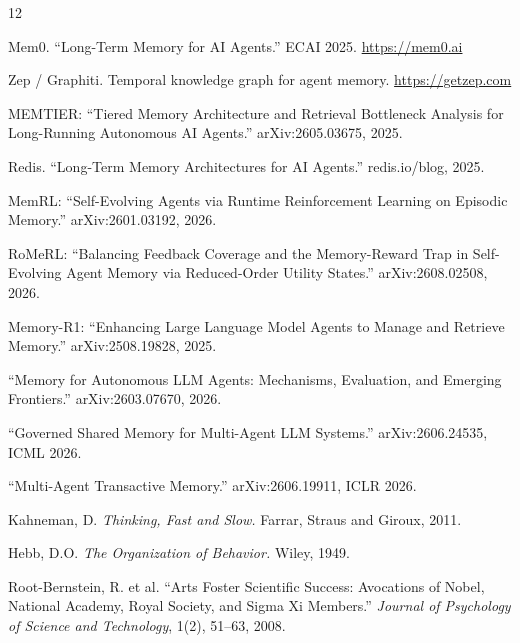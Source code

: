 \documentclass[11pt,a4paper]{article}
\begin{document}
\begin{thebibliography}{12}

Mem0. ``Long-Term Memory for AI Agents.'' ECAI 2025. \url{https://mem0.ai}

Zep / Graphiti. Temporal knowledge graph for agent memory. \url{https://getzep.com}

MEMTIER: ``Tiered Memory Architecture and Retrieval Bottleneck Analysis for Long-Running Autonomous AI Agents.'' arXiv:2605.03675, 2025.

Redis. ``Long-Term Memory Architectures for AI Agents.'' redis.io/blog, 2025.

MemRL: ``Self-Evolving Agents via Runtime Reinforcement Learning on Episodic Memory.'' arXiv:2601.03192, 2026.

RoMeRL: ``Balancing Feedback Coverage and the Memory-Reward Trap in Self-Evolving Agent Memory via Reduced-Order Utility States.'' arXiv:2608.02508, 2026.

Memory-R1: ``Enhancing Large Language Model Agents to Manage and Retrieve Memory.'' arXiv:2508.19828, 2025.

``Memory for Autonomous LLM Agents: Mechanisms, Evaluation, and Emerging Frontiers.'' arXiv:2603.07670, 2026.

``Governed Shared Memory for Multi-Agent LLM Systems.'' arXiv:2606.24535, ICML 2026.

``Multi-Agent Transactive Memory.'' arXiv:2606.19911, ICLR 2026.

Kahneman, D. \textit{Thinking, Fast and Slow.} Farrar, Straus and Giroux, 2011.

Hebb, D.O. \textit{The Organization of Behavior.} Wiley, 1949.

Root-Bernstein, R. et al. ``Arts Foster Scientific Success: Avocations of Nobel, National Academy, Royal Society, and Sigma Xi Members.'' \textit{Journal of Psychology of Science and Technology}, 1(2), 51--63, 2008.

\end{thebibliography}
\end{document}
